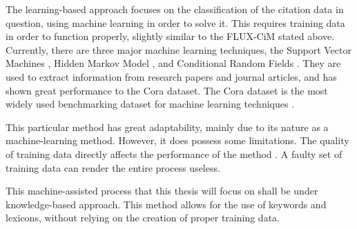 	The learning-based approach focuses on the classification of the citation data in question, using machine learning in order to solve it. This requires training data in order to function properly, slightly similar to the FLUX-CiM stated above. Currently, there are three major machine learning techniques, the Support Vector Machines \cite{svm}, Hidden Markov Model \cite{markov}, and Conditional Random Fields \cite{crf}.  They are used to extract information from research papers and journal articles, and has shown great performance to the Cora dataset. The Cora dataset is the most widely used benchmarking dataset for machine learning techniques \cite{cora}. 

This particular method has great adaptability, mainly due to its nature as a machine-learning method. However, it does possess some limitations. The quality of training data directly affects the performance of the method \cite{bibpro}. A faulty set of training data can render the entire process useless. 

	This machine-assisted process that this thesis will focus on shall be under knowledge-based approach. This method allows for the use of keywords and lexicons, without relying on the creation of proper training data. 
